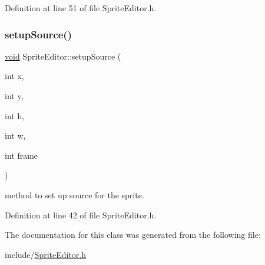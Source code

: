 Definition at line 51 of file Sprite\+Editor.\+h.

\mbox{\label{class_sprite_editor_ac07d9fe0838a38bbb8dfe7303ee48807}} 
\subsubsection{\texorpdfstring{setupSource()}{setupSource()}}
{\footnotesize\ttfamily \mbox{\hyperlink{_s_d_l__opengles2__gl2ext_8h_ae5d8fa23ad07c48bb609509eae494c95}{void}} Sprite\+Editor\+::setup\+Source (\begin{DoxyParamCaption}\item[{int}]{x,  }\item[{int}]{y,  }\item[{int}]{h,  }\item[{int}]{w,  }\item[{int}]{frame }\end{DoxyParamCaption})\hspace{0.3cm}{\ttfamily [inline]}}



method to set up source for the sprite. 



Definition at line 42 of file Sprite\+Editor.\+h.



The documentation for this class was generated from the following file\+:\begin{DoxyCompactItemize}
\item 
include/\mbox{\hyperlink{_sprite_editor_8h}{Sprite\+Editor.\+h}}\end{DoxyCompactItemize}
